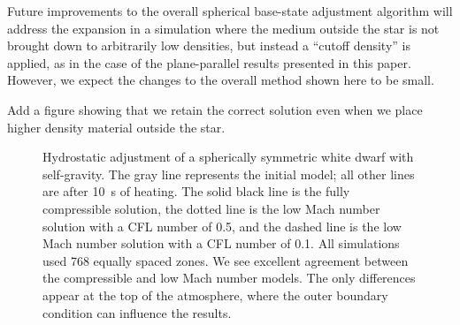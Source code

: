 Future improvements to the overall spherical base-state adjustment
algorithm will address the expansion in a simulation where the medium
outside the star is not brought down to arbitrarily low densities, but
instead a ``cutoff density'' is applied, as in the case of the
plane-parallel results presented in this paper. However, we expect
the changes to the overall method shown here to be small. 

{\color{red} Add a figure showing that we retain the correct solution 
even when we place higher density material outside the star.}


\clearpage

\begin{figure*}
\begin{center}
\end{center}
\caption{\label{fig:spherical768} Hydrostatic adjustment of a
spherically symmetric white dwarf with self-gravity.  The gray line
represents the initial model;  all other lines are after 10~s of heating.
The solid black line is the fully compressible solution, the dotted line is the
low Mach number solution with a CFL number of 0.5,  and the dashed line is
the low Mach number solution with a CFL number of 0.1.  All
simulations used 768 equally spaced zones.  We see excellent agreement
between the compressible and low Mach number models.  The only
differences appear at the top of the atmosphere, where the outer
boundary condition can influence the results.}
\end{figure*}




